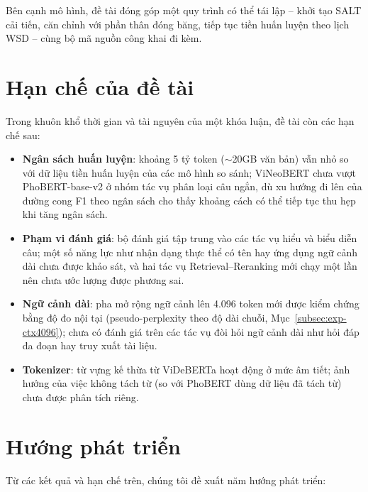 Bên cạnh mô hình, đề tài đóng góp một quy trình có thể tái lập -- khởi
tạo SALT cải tiến, căn chỉnh với phần thân đóng băng, tiếp tục tiền huấn luyện theo lịch WSD -- cùng
bộ mã nguồn công khai đi kèm.

\section{Hạn chế của đề tài}
\label{sec:limitations}

Trong khuôn khổ thời gian và tài nguyên của một khóa luận, đề tài còn các hạn chế
sau:

\begin{itemize}
  \item \textbf{Ngân sách huấn luyện}: khoảng 5 tỷ token ($\sim$20GB văn bản) vẫn
        nhỏ so với dữ liệu tiền
        huấn luyện của các mô hình so sánh; ViNeoBERT chưa vượt PhoBERT-base-v2 ở
        nhóm tác vụ phân loại câu ngắn, dù xu hướng đi lên của đường cong F1 theo ngân sách cho
        thấy khoảng cách có thể tiếp tục thu hẹp khi tăng ngân sách.
  \item \textbf{Phạm vi đánh giá}: bộ đánh giá tập trung vào các tác vụ hiểu và biểu
        diễn câu; một số năng lực như nhận dạng thực thể có tên hay ứng dụng ngữ cảnh
        dài chưa được khảo sát, và hai tác vụ Retrieval--Reranking mới chạy một lần
        nên chưa ước lượng được phương sai.
  \item \textbf{Ngữ cảnh dài}: pha mở rộng ngữ cảnh lên 4.096 token mới được kiểm
        chứng bằng độ đo nội tại (pseudo-perplexity theo độ dài chuỗi,
        Mục~\ref{subsec:exp-ctx4096}); chưa có đánh giá trên các tác vụ
        đòi hỏi ngữ cảnh dài như hỏi đáp đa đoạn hay truy xuất tài liệu.
  \item \textbf{Tokenizer}: từ vựng kế thừa từ ViDeBERTa hoạt động ở mức âm tiết;
        ảnh hưởng của việc không tách từ (so với PhoBERT dùng dữ liệu đã tách từ)
        chưa được phân tích riêng.
\end{itemize}

\section{Hướng phát triển}
\label{sec:future-work}

Từ các kết quả và hạn chế trên, chúng tôi đề xuất năm hướng phát triển:

